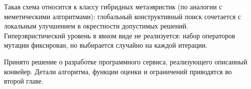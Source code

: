 Такая схема относится к классу гибридных метаэвристик (по аналогии с меметическими алгоритмами): глобальный конструктивный поиск сочетается с локальным улучшением в окрестности допустимых решений. Гиперэвристический уровень в явном виде не реализуется: набор операторов мутации фиксирован, но выбирается случайно на каждой итерации.

Принято решение о разработке программного сервиса, реализующего описанный конвейер. Детали алгоритма, функции оценки и ограничений приводятся во второй главе.
